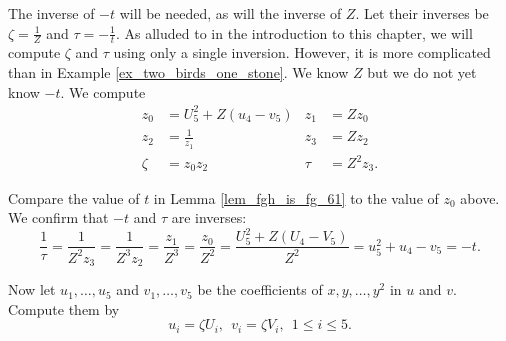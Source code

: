 The inverse of $-t$ will be needed, as will the inverse of $Z$.
Let their inverses be $\zeta = \frac 1 Z$ and $\tau = -\frac 1 t$.
As alluded to in the introduction to this chapter,
we will compute $\zeta$ and $\tau$ using only a single inversion.
However, it is more complicated than in Example \ref{ex_two_birds_one_stone}.
We know $Z$ but we do not yet know $-t$. We compute
\begin{align*}
  z_0 &= U_5^2 + Z(u_4 - v_5) &  z_1 &= Zz_0 \\
  z_2 &= \frac 1 {z_1} & z_3 &= Zz_2 \\
  \zeta &= z_0z_2 &  \tau &= Z^2z_3.
\end{align*}
\begin{comment}
\begin{align*}
  z_0 &= U_5^2 - Z(U_5c_8 - u_4 + v_5) \\
  z_1 &= Zz_0 \\
  z_2 &= \frac 1 {z_1} \\
  z_3 &= Zz_2 \\
  \zeta &= z_0z_2 \\
  \tau  &= Z^2z_3.
\end{align*}
\end{comment}
Compare the value of $t$ in Lemma \ref{lem_fgh_is_fg_61} to the value of $z_0$ above.
We confirm that $-t$ and $\tau$ are inverses:
\[ \frac 1 \tau = \frac 1 {Z^2z_3} 
                = \frac 1 {Z^3z_2} 
                = \frac {z_1} {Z^3} 
                = \frac {z_0} {Z^2}
                = \frac {U_5^2 + Z(U_4 - V_5)} {Z^2}
                = u_5^2 + u_4 - v_5
                = -t. \]
\begin{comment}
\[ \frac 1 \tau = \frac 1 {Z^2z_3} 
                = \frac 1 {Z^3z_2} 
                = \frac {z_1} {Z^3} 
                = \frac {z_0} {Z^2}
                = \frac {U_5^2 - Z(U_5c_8 - U_4 + V_5)} {Z^2}
                = u_5^2 - u_5c_8 + u_4 - v_5
                = -t. \]
\end{comment}
Now let $u_1, \ldots, u_5$ and $v_1, \ldots, v_5$ be the coefficients of $x, y, \ldots, y^2$ in $u$ and $v$.
Compute them by
\[ u_i = \zeta U_i, ~~v_i = \zeta V_i, ~~1 \leq i \leq 5. \]

